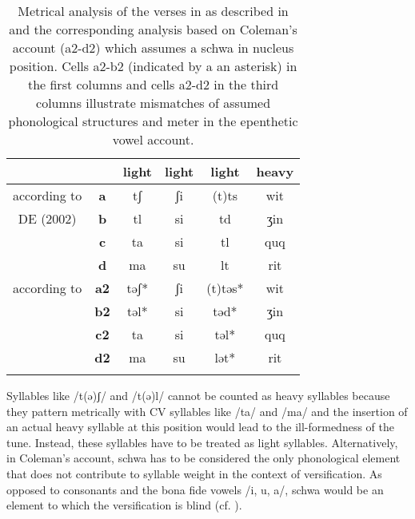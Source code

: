\begin{table}

\caption{Metrical analysis of the verses in  as described in \citet[352]{Ridouane2008} and the corresponding analysis based on Coleman’s account (a2-d2) which assumes a schwa in nucleus position. Cells a2-b2 (indicated by a an asterisk) in the first columns and cells a2-d2 in the third columns illustrate mismatches of assumed phonological structures and meter in the epenthetic vowel account.}
\label{tab:6.1}
\begin{tabular}{cccccc}
\lspbottomrule
&    & \textbf{light} & \textbf{light} & \textbf{light}  & \textbf{heavy} \\
\midrule
according to       				  & \textbf{a}  & tʃ    & ʃi    & (t)ts  & wit   \\
DE (2002)	                   	  & \textbf{b}  & tl    & si    & td     & ʒin   \\
                                  & \textbf{c}  & ta    & si    & tl     & quq   \\
                                  & \textbf{d}  & ma    & su    & lt     & rit   \\
\midrule
according to 					  & \textbf{a2} & təʃ*   & ʃi    & (t)təs* & wit \\
\citet{Coleman2001}              	  & \textbf{b2} & təl*   & si    & təd*    & ʒin   \\
                                  & \textbf{c2} & ta    & si    & təl*    & quq   \\
                                  & \textbf{d2} & ma    & su    & lət*    & rit   \\
\lspbottomrule                                  
\end{tabular}
\end{table}

Syllables like /t(ə)ʃ/ and /t(ə)l/ cannot be counted as heavy syllables because they pattern metrically with CV syllables like /ta/ and /ma/ and the insertion of an actual heavy syllable at this position would lead to the ill-formedness of the tune. Instead, these syllables have to be treated as light syllables. Alternatively, in Coleman’s account, schwa has to be considered the only phonological element that does not contribute to syllable weight in the context of versification. As opposed to consonants and the bona fide vowels /i, u, a/, schwa would be an element to which the versification is blind (cf. \citealt{DE2002,Ridouane2008}).  


